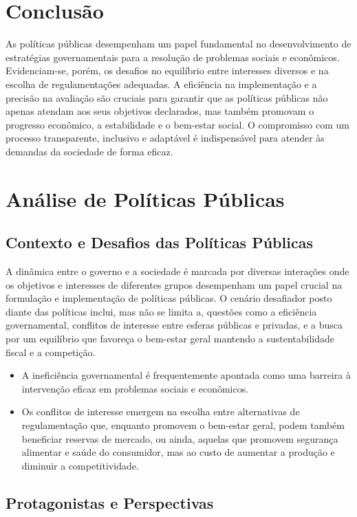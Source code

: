 \documentclass[
   article,       
   12pt,          
   oneside,       
   a4paper,       
   english,       
   brazil,        
   sumario=tradicional
   ]{abntex2}
\begin{document}
\section{Conclusão}
As políticas públicas desempenham um papel fundamental no desenvolvimento de estratégias governamentais para a resolução de problemas sociais e econômicos. Evidenciam-se, porém, os desafios no equilíbrio entre interesses diversos e na escolha de regulamentações adequadas. A eficiência na implementação e a precisão na avaliação são cruciais para garantir que as políticas públicas não apenas atendam aos seus objetivos declarados, mas também promovam o progresso econômico, a estabilidade e o bem-estar social. O compromisso com um processo transparente, inclusivo e adaptável é indispensável para atender às demandas da sociedade de forma eficaz.
\section{Análise de Políticas Públicas}

\subsection{Contexto e Desafios das Políticas Públicas}

A dinâmica entre o governo e a sociedade é marcada por diversas interações onde os objetivos e interesses de diferentes grupos desempenham um papel crucial na formulação e implementação de políticas públicas. O cenário desafiador posto diante das políticas inclui, mas não se limita a, questões como a eficiência governamental, conflitos de interesse entre esferas públicas e privadas, e a busca por um equilíbrio que favoreça o bem-estar geral mantendo a sustentabilidade fiscal e a competição.

\begin{itemize}
    \item A ineficiência governamental é frequentemente apontada como uma barreira à intervenção eficaz em problemas sociais e econômicos.
    \item Os conflitos de interesse emergem na escolha entre alternativas de regulamentação que, enquanto promovem o bem-estar geral, podem também beneficiar reservas de mercado, ou ainda, aquelas que promovem segurança alimentar e saúde do consumidor, mas ao custo de aumentar a produção e diminuir a competitividade.
\end{itemize}

\subsection{Protagonistas e Perspectivas}
\end{document}
